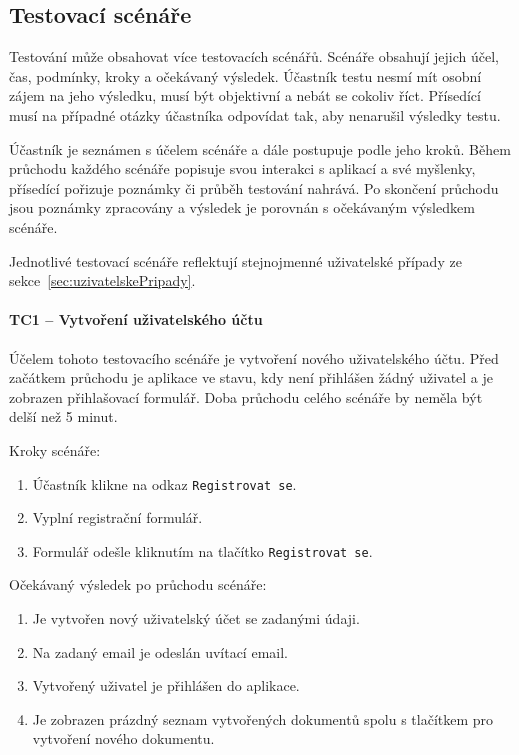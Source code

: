 
\subsection{Testovací scénáře}\label{subsec:testovacíScénáře}

Testování může obsahovat více testovacích scénářů.
Scénáře obsahují jejich účel, čas, podmínky, kroky a očekávaný výsledek.
Účastník testu nesmí mít osobní zájem na jeho výsledku, musí být objektivní a nebát se cokoliv říct.
Přísedící musí na případné otázky účastníka odpovídat tak, aby nenarušil výsledky testu.

Účastník je seznámen s účelem scénáře a dále postupuje podle jeho kroků.
Během průchodu každého scénáře popisuje svou interakci s aplikací a své myšlenky, přísedící pořizuje poznámky či průběh testování nahrává.
Po skončení průchodu jsou poznámky zpracovány a výsledek je porovnán s očekávaným výsledkem scénáře.

Jednotlivé testovací scénáře reflektují stejnojmenné uživatelské případy ze sekce~\ref{sec:uzivatelskePripady}.

\paragraph{TC1 -- Vytvoření uživatelského účtu}

Účelem tohoto testovacího scénáře je vytvoření nového uživatelského účtu.
Před začátkem průchodu je aplikace ve stavu, kdy není přihlášen žádný uživatel a je zobrazen přihlašovací formulář.
Doba průchodu celého scénáře by neměla být delší než 5 minut.

Kroky scénáře:
\begin{enumerate}
    \item Účastník klikne na odkaz \texttt{Registrovat se}.
    \item Vyplní registrační formulář.
    \item Formulář odešle kliknutím na tlačítko \texttt{Registrovat se}.
\end{enumerate}

\pagebreak

Očekávaný výsledek po průchodu scénáře:
\begin{enumerate}
    \item Je vytvořen nový uživatelský účet se zadanými údaji.
    \item Na zadaný email je odeslán uvítací email.
    \item Vytvořený uživatel je přihlášen do aplikace.
    \item Je zobrazen prázdný seznam vytvořených dokumentů spolu s tlačítkem pro vytvoření nového dokumentu.
\end{enumerate}

